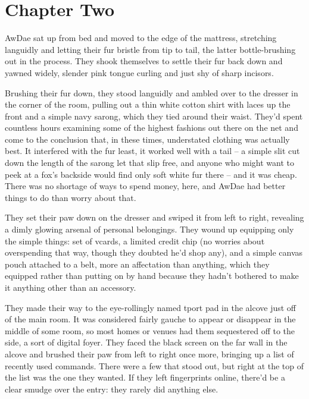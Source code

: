 \chapter*{Chapter Two}

AwDae sat up from bed and moved to the edge of the mattress, stretching languidly and letting their fur bristle from tip to tail, the latter bottle-brushing out in the process.  They shook themselves to settle their fur back down and yawned widely, slender pink tongue curling and just shy of sharp incisors.

Brushing their fur down, they stood languidly and ambled over to the dresser in the corner of the room, pulling out a thin white cotton shirt with laces up the front and a simple navy sarong, which they tied around their waist.  They'd spent countless hours examining some of the highest fashions out there on the net and come to the conclusion that, in these times, understated clothing was actually best.  It interfered with the fur least, it worked well with a tail -- a simple slit cut down the length of the sarong let that slip free, and anyone who might want to peek at a fox's backside would find only soft white fur there -- and it was cheap.  There was no shortage of ways to spend money, here, and AwDae had better things to do than worry about that.

They set their paw down on the dresser and swiped it from left to right, revealing a dimly glowing arsenal of personal belongings.  They wound up equipping only the simple things: set of vcards, a limited credit chip (no worries about overspending that way, though they doubted he'd shop any), and a simple canvas pouch attached to a belt, more an affectation than anything, which they equipped rather than putting on by hand because they hadn't bothered to make it anything other than an accessory.

They made their way to the eye-rollingly named tport pad in the alcove just off of the main room.  It was considered fairly gauche to appear or disappear in the middle of some room, so most homes or venues had them sequestered off to the side, a sort of digital foyer.  They faced the black screen on the far wall in the alcove and brushed their paw from left to right once more, bringing up a list of recently used commands.  There were a few that stood out, but right at the top of the list was the one they wanted.  If they left fingerprints online, there'd be a clear smudge over the entry: they rarely did anything else.

